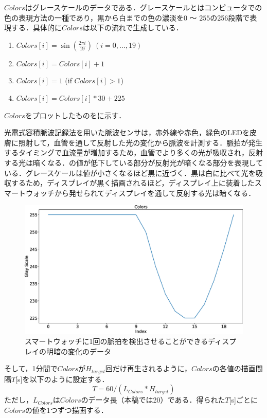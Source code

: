 \documentclass[Japanese,noauthor]{dicomopapers}
\begin{document}
$Colors$はグレースケールのデータである．グレースケールとはコンピュータでの色の表現方法の一種であり，黒から白までの色の濃淡を$0$ ～ $255$の256段階で表現する．具体的に$Colors$は以下の流れで生成している．
\begin{enumerate}
  \renewcommand{\labelenumi}{\arabic{enumi}.}
  \item $Colors[i]=\sin\left(\frac{2\pi i}{19}\right)~(i=0,\dots,19)$
  \item $Colors[i]=Colors[i]+1$
  \item $Colors[i]=1$ (if $Colors[i]>1$)
  \item $Colors[i]=Colors[i]*30+225$
\end{enumerate}
$Colors$をプロットしたものをに示す．

光電式容積脈波記録法を用いた脈波センサは，赤外線や赤色，緑色のLEDを皮膚に照射して，血管を通して反射した光の変化から脈波を計測する．脈拍が発生するタイミングで血流量が増加するため，血管でより多くの光が吸収され，反射する光は暗くなる．の値が低下している部分が反射光が暗くなる部分を表現している．グレースケールは値が小さくなるほど黒に近づく．黒は白に比べて光を吸収するため，ディスプレイが黒く描画されるほど，ディスプレイ上に装着したスマートウォッチから発せられてディスプレイを通して反射する光は暗くなる．

\begin{figure}[!t]
  \centering
  \includegraphics[width=1\linewidth]{figures/colors_wave.eps}
  \caption{スマートウォッチに1回の脈拍を検出させることができるディスプレイの明暗の変化のデータ}
  \label{fig:colors_wave}
\end{figure}

そして，1分間で$Colors$が$H_{target}$回だけ再生されるように，$Colors$の各値の描画間隔$T$[s]を以下のように設定する．
\begin{equation}
  \label{eqn:wait}
  T = 60 / (L_{Colors} * H_{target})
\end{equation}
ただし，$L_{Colors}$は$Colors$のデータ長（本稿では20）である．得られた$T$[s]ごとに$Colors$の値を1つずつ描画する．
\end{document}
